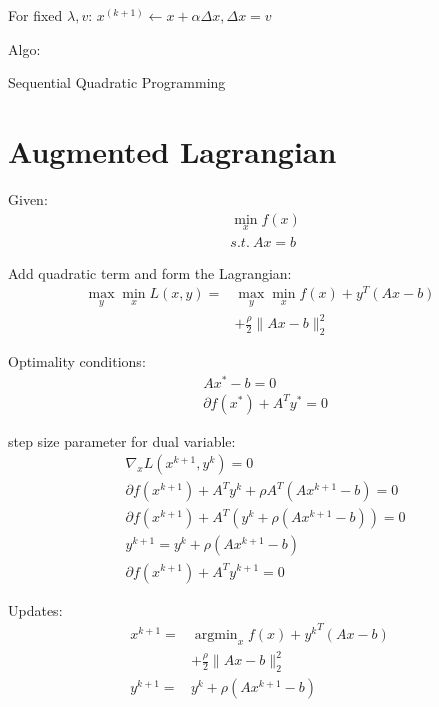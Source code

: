 \message{ !name(notebook.tex)}\documentclass[8pt]{report}
\DeclareMathOperator*{\argmin}{argmin}
\newcommand{\norm}[1]{\|#1\|}
\begin{document}
\begin{multicols*}{2}
  For fixed $\lambda, v$: $x^{(k+1)} \leftarrow x + \alpha \Delta x, \Delta x = v$
  
  Algo:\\
  \begin{algorithm}[H]
    \caption{Sequential Quadratic Programming\label{algo:SQP}}
  \end{algorithm}
  
  \vfill\null
  
  \pagebreak

  \section{Augmented Lagrangian}

  Given:
  \begin{align*}
    & \min_x f(x)\\
    & s.t.\ Ax = b
  \end{align*}

  Add quadratic term and form the Lagrangian:
  \begin{align*}
    \max_y \min_x L(x,y) = & \max_y \min_x f(x) + y^T(Ax-b)\\
                           & + \frac{\rho}{2}\norm{Ax-b}_2^2
  \end{align*}

  Optimality conditions:
  \begin{align*}
    & Ax^* - b = 0\\
    & \partial f(x^*) + A^Ty^* = 0
  \end{align*}

  step size parameter for dual variable:
  \begin{align*}
    &\nabla_x L(x^{k+1},y^k) = 0\\
    &\partial f(x^{k+1}) + A^T y^k + \rho A^T(Ax^{k+1}-b)=0\\
    &\partial f(x^{k+1}) + A^T( y^k + \rho(Ax^{k+1}-b))=0\\
    &y^{k+1} = y^k + \rho(Ax^{k+1}-b)\\
    &\partial f(x^{k+1}) + A^T y^{k+1}=0
  \end{align*}
  
  Updates:
  \begin{align*}
    x^{k+1} = & \argmin_x f(x) + {y^{k}}^T(Ax-b)\\
                           & + \frac{\rho}{2}\norm{Ax-b}_2^2\\
    y^{k+1} = & y^k + \rho(Ax^{k+1}-b)
  \end{align*}


\end{multicols*}
\end{document}

